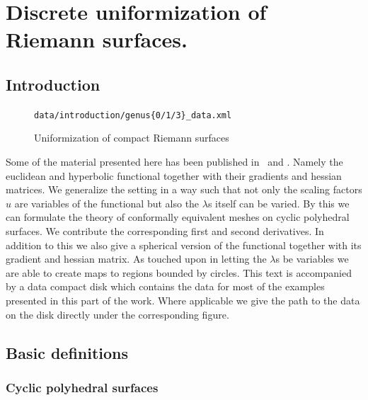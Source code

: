 \documentclass[Thesis]{subfiles}
\begin{document}

\chapter{Discrete uniformization of Riemann surfaces.}
\label{chp:uniformization}

\section{Introduction}

\begin{figure}
\centering
{}
{\scriptsize\tt data/introduction/genus\{0/1/3\}\_data.xml} 
\caption{Uniformization of compact Riemann surfaces}
\label{fig:intro_uniformization}
\end{figure}

Some of the material presented here has been published in~\cite{Bobenko2010} and \cite{Springborn2008}. 
Namely the euclidean and hyperbolic functional together with their gradients and hessian matrices. 
We generalize the setting in a way such that not only the scaling factors $u$ are variables of the functional but also the $\lambda$s itself can be varied. By this we can formulate the theory of conformally equivalent meshes on cyclic polyhedral surfaces.
We contribute the corresponding first and second derivatives. 
In addition to this we also give a spherical version of the functional together with its gradient and hessian matrix. 
As touched upon in \cite{Bobenko2010} letting the $\lambda$s be variables we are able to create maps to regions bounded by circles.
This text is accompanied by a data compact disk which contains the data for most of the examples presented in this part of the work. 
Where applicable we give the path to the data on the disk directly under the corresponding figure.

\section{Basic definitions}

\subsection{Cyclic polyhedral surfaces }
\end{document}
